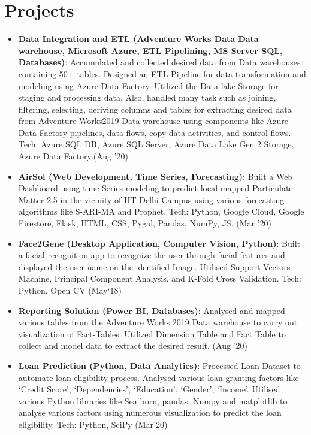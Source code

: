 \documentclass[a4paper,20pt]{article}
\newcommand{\resumeItem}[2]{
  \item\small{
    \textbf{#1}{: #2 \vspace{-2pt}}
  }
}
\newcommand{\resumeSubItem}[2]{\resumeItem{#1}{#2}\vspace{-3pt}}
\newcommand{\resumeSubHeadingListStart}{\begin{itemize}[leftmargin=*]}
\newcommand{\resumeSubHeadingListEnd}{\end{itemize}}
\begin{document}
\section{Projects}
\resumeSubHeadingListStart
\resumeSubItem{Data Integration and ETL (Adventure Works Data Data warehouse, Microsoft Azure, ETL Pipelining, MS Server SQL, Databases)}{Accumulated and collected desired data from Data warehouses containing 50+ tables. Designed an ETL Pipeline for data transformation and modeling using Azure Data Factory. Utilized the Data lake Storage for staging and processing data. Also, handled many task such as joining, filtering, selecting, deriving columns and tables for extracting desired data from Adventure Works2019 Data warehouse using components like Azure Data Factory pipelines, data flows, copy data activities, and control flows. Tech: Azure SQL DB, Azure SQL Server, Azure Data Lake Gen 2 Storage, Azure Data Factory.(Aug ’20)}
\vspace{2pt}
\resumeSubItem{AirSol (Web Development, Time Series, Forecasting)}{Built a Web Dashboard using time Series modeling to predict local mapped Particulate Matter 2.5 in the vicinity of IIT Delhi Campus using various forecasting algorithms like S-ARI-MA and Prophet. Tech: Python, Google Cloud, Google Firestore, Flask, HTML, CSS, Pygal, Pandas, NumPy, JS. (Mar '20)}
\vspace{2pt}
\resumeSubItem{Face2Gene (Desktop Application, Computer Vision, Python)}{Built a facial recognition app to recognize the user through facial features and displayed the user name on the identified Image. Utilised Support Vectors Machine, Principal Component Analysis, and K-Fold Cross Validation. Tech: Python, Open CV (May`18)}
\vspace{2pt}
\resumeSubItem{Reporting Solution (Power BI, Databases)}{Analysed and mapped various tables from the Adventure Works 2019 Data warehouse to carry out visualization of Fact-Tables. Utilized Dimension Table and Fact Table to collect and model data to extract the desired result. (Aug ’20)}
\vspace{2pt}
\resumeSubItem{Loan Prediction (Python, Data Analytics)}{Processed Loan Dataset to automate loan eligibility process. Analysed various loan granting factors like `Credit Score', `Dependencies', `Education', `Gender', `Income'. Utilised various Python libraries like Sea born, pandas, Numpy and matplotlib to analyse various factors using numerous visualization to predict the loan eligibility. Tech: Python, SciPy (Mar'20)}
\resumeSubHeadingListEnd
\vspace{-5pt}
\end{document}
